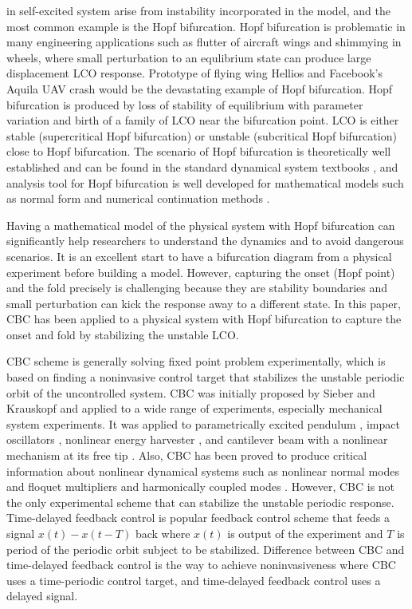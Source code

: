 \documentclass[openacc]{rsproca_new}%
\theoremstyle{own}
\begin{document}
\noindent in self-excited system arise from instability incorporated in the model, and the most common example is the Hopf bifurcation. Hopf bifurcation is problematic in many engineering applications such as flutter of aircraft wings and shimmying in wheels, where small perturbation to an equlibrium state can produce large displacement LCO response. Prototype of flying wing Hellios \cite{noll2004investigation} and Facebook's Aquila UAV crash would be the devastating example of Hopf bifurcation. Hopf bifurcation is produced by loss of stability of equilibrium with parameter variation and birth of a family of LCO near the bifurcation point. LCO is either stable (supercritical Hopf bifurcation) or unstable (subcritical Hopf bifurcation) close to Hopf bifurcation. The scenario of Hopf bifurcation is theoretically well established and can be found in the standard dynamical system textbooks \cite{kuznetsov2013elements}, and analysis tool for Hopf bifurcation is well developed for mathematical models such as normal form \cite{yu2002simplest,ashwin1995numerical} and numerical continuation methods \cite{doedel2000auto2000,dankowicz2013recipes}.

Having a mathematical model of the physical system with Hopf bifurcation can significantly help researchers to understand the dynamics and to avoid dangerous scenarios.  It is an excellent start to have a bifurcation diagram from a physical experiment before building a model. However, capturing the onset (Hopf point) and the fold precisely is challenging because they are stability boundaries and small perturbation can kick the response away to a different state. In this paper, CBC has been applied to a physical system with Hopf bifurcation to capture the onset and fold by stabilizing the unstable LCO.

CBC scheme is generally solving fixed point problem experimentally, which is based on finding a noninvasive control target that stabilizes the unstable periodic orbit of the uncontrolled system. CBC was initially proposed by Sieber and Krauskopf \cite{sieber2008control} and applied to a wide range of experiments, especially mechanical system experiments. It was applied to parametrically excited pendulum \cite{sieber2011control}, impact oscillators \cite{bureau2013experimental,bureau2014experimental}, nonlinear energy harvester \cite{barton2013systematic,barton2011numerical}
, and cantilever beam with a nonlinear mechanism at its free tip \cite{renson2019application}. Also, CBC has been proved to produce critical information about nonlinear dynamical systems such as nonlinear normal modes \cite{renson2016robust,renson2016experimental} and floquet multipliers \cite{barton2017control} and harmonically coupled modes \cite{renson2019application}. However, CBC is not the only experimental scheme that can stabilize the unstable periodic response. Time-delayed feedback control \cite{pyragas2006delayed,sieber2016generic} is popular feedback control scheme that feeds a signal $x(t)-x(t-T)$ back where $x(t)$ is output of the experiment and $T$ is period of the periodic orbit subject to be stabilized. Difference between CBC and time-delayed feedback control is the way to achieve noninvasiveness where CBC uses a time-periodic control target, and time-delayed feedback control uses a delayed signal.
\end{document}

